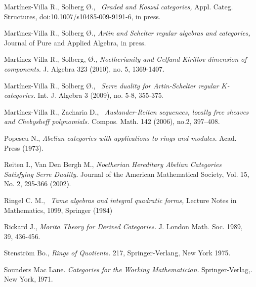 \documentclass{amsart}
\theoremstyle{plain}
\numberwithin{equation}{section}
\begin{document}
\begin{thebibliography}{ABPRS}
 Mart\'inez-Villa R., Solberg \O {}., \textsl{\ Graded
and Koszul categories,} Appl. Categ. Structures,
doi:10.1007/s10485-009-9191-6, in press.

 Mart\'{\i}nez-Villa R., Solberg \O {}., \textsl{Artin
and Schelter regular algebras and categories,} Journal of Pure and Applied
Algebra, in press.

 Mart\'inez-Villa R., Solberg, \O {}., \textsl{Noetherianity and Gelfand-Kirillov dimension of components.} J. Algebra 323
(2010), no. 5, 1369-1407.

 Mart\'inez-Villa R., Solberg \O {}., \textsl{\ Serre
duality for Artin-Schelter regular $K$-categories.} Int. J. Algebra 3
(2009), no. 5-8, 355-375.

 Mart\'inez-Villa R., Zacharia D., \textsl{\
Auslander-Reiten sequences, locally free sheaves and Chebysheff polynomials.}
Compos. Math. 142 (2006), no.2, 397--408.

 Popescu N., \textsl{Abelian categories with applications to
rings and modules.} Acad. Press (1973).

 Reiten I., Van Den Bergh M.,  \textsl{Noetherian Hereditary Abelian Categories Satisfying Serre Duality. }
 Journal of the American Mathematical Society, Vol. 15, No. 2, 295-366 (2002).

 Ringel C. M., \textsl{\ Tame algebras and integral quadratic
forms,} Lecture Notes in Mathematics, 1099, Springer (1984)

 Rickard J., \textsl {Morita  Theory for Derived Categories.}
J. London Math. Soc. 1989, 39, 436-456.

 Stenstr\"{o}m Bo., \textsl{Rings of Quotients.} 217,
Springer-Verlang, New York 1975.

 Sounders Mac Lane. \textsl{Categories for the Working
Mathematician.} Springer-Verlag,. New York, I971.
\end{thebibliography}
\end{document}

